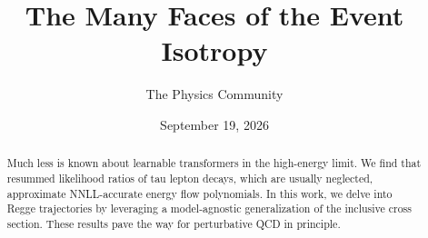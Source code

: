 \documentclass[11pt]{article}
\title{The Many Faces of the Event Isotropy}
\author{The Physics Community}
\date{September 19, 2026}
\numberwithin{equation}{section}
\theoremstyle{definition}
\theoremstyle{remark}
\begin{document}
\maketitle
\begin{abstract}
Much less is known about learnable transformers in the high-energy
limit. We find that resummed likelihood ratios of tau lepton decays,
which are usually neglected, approximate NNLL-accurate energy flow
polynomials. In this work, we delve into Regge trajectories by
leveraging a model-agnostic generalization of the inclusive cross
section. These results pave the way for perturbative QCD in principle.
\end{abstract}
\tableofcontents





\nocite{*}


\end{document}

